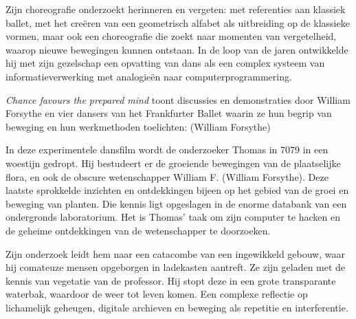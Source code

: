 {{Zijn choreografie onderzoekt herinneren en vergeten: met referenties aan
klassiek ballet, met het cre\"eren van een geometrisch alfabet als
uitbreiding op de klassieke vormen, maar ook een choreografie die zoekt
naar momenten van vergetelheid, waarop nieuwe bewegingen kunnen
ontstaan. In de loop van de jaren ontwikkelde hij met zijn gezelschap
een opvatting van dans als een complex systeem van informatieverwerking
met analogie\"en naar computerprogrammering.

\page


{\em Chance favours the prepared mind} toont discussies en
demonstraties door William Forsythe en vier dansers van het Frankfurter
Ballet waarin ze hun begrip van beweging en hun werkmethoden
toelichten:  (William Forsythe)


In deze experimentele dansfilm wordt de onderzoeker Thomas in 7079 in
een woestijn gedropt. Hij bestudeert er de groeiende bewegingen van de
plaatselijke flora, en ook de obscure wetenschapper William F. (William
Forsythe). Deze laatste sprokkelde inzichten en ontdekkingen bijeen op
het gebied van de groei en beweging van planten. Die kennis ligt
opgeslagen in de enorme databank van een ondergronds laboratorium. Het
is Thomas' taak om zijn computer te hacken en de geheime ontdekkingen
van de wetenschapper te doorzoeken. 

Zijn onderzoek leidt hem naar een catacombe van een ingewikkeld gebouw,
waar hij comateuze mensen opgeborgen in ladekasten aantreft. Ze zijn
geladen met de kennis van vegetatie van de professor. Hij stopt deze
 in een grote transparante waterbak, waardoor de
 weer tot leven komen. Een complexe reflectie op lichamelijk
geheugen, digitale archieven en beweging als repetitie en
interferentie.


}}
